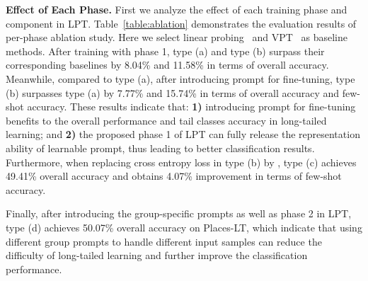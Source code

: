 \documentclass{article} \usepackage{iclr2023_conference,times}
\begin{document}
\textbf{Effect of Each Phase. }
First we analyze the effect of each training phase and component in LPT. Table~\ref{table:ablation} demonstrates the evaluation results of per-phase ablation study. Here we select linear probing~\citep{dosovitskiy2021an} and VPT~\citep{jia2022vpt} as baseline methods. 
After training with phase 1, type (a) and type (b) surpass their corresponding baselines by 8.04\% and 11.58\% in terms of overall accuracy. Meanwhile, compared to type (a), after introducing prompt for fine-tuning, type (b) surpasses type (a) by 7.77\% and 15.74\% in terms of overall accuracy and few-shot accuracy. These results indicate that: \textbf{1)} introducing prompt for fine-tuning benefits to the overall performance and tail classes accuracy in long-tailed learning; and \textbf{2)} the proposed phase 1 of LPT can fully release the representation ability of learnable prompt, thus leading to better classification results. Furthermore, when replacing cross entropy loss in type (b) by , type (c) achieves 49.41\% overall accuracy and obtains 4.07\% improvement in terms of few-shot accuracy. 
\begin{table}[t]
   \caption{Ablation study of each phase in LPT on Places-LT benchmark~\citep{zhou2017places}.}
    \vspace{-1em}
   \label{table:ablation}
   \begin{center}
      \setlength{\tabcolsep}{7.6pt} \renewcommand{\arraystretch}{2.2}{ \fontsize{8.3}{3}}
   \vspace{-1.5em}
\end{center}
\end{table}
Finally, after introducing the group-specific prompts as well as phase 2 in LPT, type (d) achieves 50.07\% overall accuracy on Places-LT, which indicate that using different group prompts to handle different input samples can reduce the difficulty of long-tailed learning and further improve the classification performance. 
\end{document}

